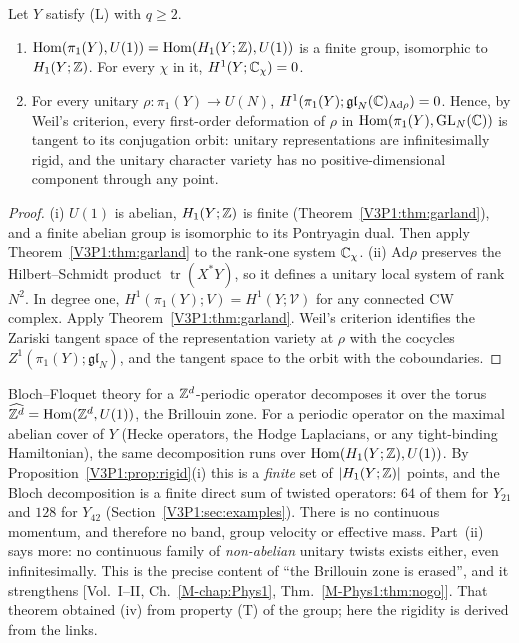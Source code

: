 \begin{proposition}\label{V3P1:prop:rigid}
Let $Y$ satisfy \textup{(L)} with $q\ge2$.
\begin{enumerate}
\item[(i)] $\operatorname{Hom}(\pi_1(Y),U(1))=\operatorname{Hom}(H_1(Y;\mathbb{Z}),U(1))$ is a finite group, isomorphic to
$H_1(Y;\mathbb{Z})$. For every $\chi$ in it, $H^{1}(Y;\mathbb{C}_\chi)=0$.
\item[(ii)] For every unitary $\rho\colon\pi_1(Y)\to U(N)$, $H^{1}(\pi_1(Y);\mathfrak{gl}_N(\mathbb{C})_{\mathrm{Ad}\rho})=0$.
Hence, by Weil's criterion, every first-order deformation of $\rho$ in
$\operatorname{Hom}(\pi_1(Y),\mathrm{GL}_N(\mathbb{C}))$ is tangent to its conjugation orbit: unitary representations are
infinitesimally rigid, and the unitary character variety has no positive-dimensional
component through any point.
\end{enumerate}
\end{proposition}

\begin{proof}
(i) $U(1)$ is abelian, $H_1(Y;\mathbb{Z})$ is finite (Theorem~\ref{V3P1:thm:garland}), and a finite
abelian group is isomorphic to its Pontryagin dual. Then apply Theorem~\ref{V3P1:thm:garland}
to the rank-one system $\mathbb{C}_\chi$. (ii) $\mathrm{Ad}\rho$ preserves the Hilbert--Schmidt
product $\operatorname{tr}(X^{*}Y)$, so it defines a unitary local system of rank $N^{2}$. In
degree one, $H^{1}(\pi_1(Y);V)=H^{1}(Y;\mathcal V)$ for any connected CW complex. Apply
Theorem~\ref{V3P1:thm:garland}. Weil's criterion \cite{Wei64} identifies the Zariski tangent
space of the representation variety at $\rho$ with the cocycles $Z^{1}(\pi_1(Y);
\mathfrak{gl}_N)$, and the tangent space to the orbit with the coboundaries.
\end{proof}

\begin{remark}\label{V3P1:rem:bz}
Bloch--Floquet theory for a $\mathbb{Z}^{d}$-periodic operator decomposes it over the torus
$\widehat{\mathbb{Z}^{d}}=\operatorname{Hom}(\mathbb{Z}^{d},U(1))$, the Brillouin zone. For a periodic operator on the
maximal abelian cover of $Y$ (Hecke operators, the Hodge Laplacians, or any tight-binding
Hamiltonian), the same decomposition runs over $\operatorname{Hom}(H_1(Y;\mathbb{Z}),U(1))$. By
Proposition~\ref{V3P1:prop:rigid}(i) this is a \emph{finite} set of $|H_1(Y;\mathbb{Z})|$ points, and
the Bloch decomposition is a finite direct sum of twisted operators: $64$ of them for $Y_{21}$
and $128$ for $Y_{42}$ (Section~\ref{V3P1:sec:examples}). There is no continuous momentum, and
therefore no band, group velocity or effective mass. Part~(ii) says more: no continuous
family of \emph{non-abelian} unitary twists exists either, even infinitesimally. This is the
precise content of ``the Brillouin zone is erased'', and it strengthens
[Vol.~I--II, Ch.~\ref{M-chap:Phys1}, Thm.~\ref{M-Phys1:thm:nogo}]. That theorem obtained (iv) from property
(T) of the group; here the rigidity is derived from the links.
\end{remark}

